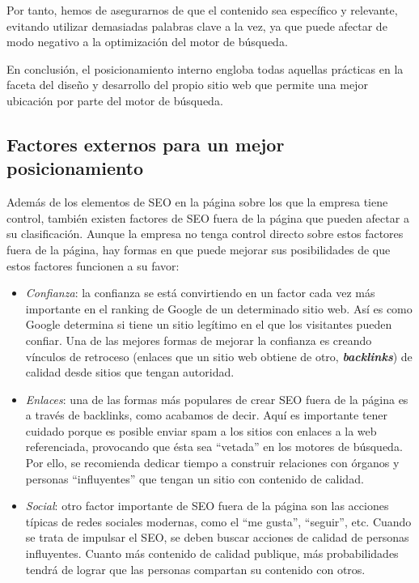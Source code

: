 \documentclass[a4paper,11pt]{scrartcl}
\begin{document}
Por tanto, hemos de asegurarnos de que el contenido sea específico y relevante, evitando utilizar demasiadas palabras clave a la vez, ya que puede afectar de modo negativo a la optimización del motor de búsqueda.

En conclusión, el posicionamiento interno engloba todas aquellas prácticas en la faceta del diseño y desarrollo del propio sitio web que permite una mejor ubicación por parte del motor de búsqueda.

\subsection{Factores externos para un mejor posicionamiento}

Además de los elementos de SEO en la página sobre los que la empresa tiene control, también existen factores de SEO fuera de la página que pueden afectar a su clasificación. Aunque la empresa no tenga control directo sobre estos factores fuera de la página, hay formas en que puede mejorar sus posibilidades de que estos factores funcionen a su favor: 

\begin{itemize}
\item 	\textit{Confianza}: la confianza se está convirtiendo en un factor cada vez más importante en el ranking de Google de un determinado sitio web. Así es como Google determina si tiene un sitio legítimo en el que los visitantes pueden confiar. Una de las mejores formas de mejorar la confianza es creando vínculos de retroceso (enlaces que un sitio web obtiene de otro, \textit{\textbf{backlinks}}) de calidad desde sitios que tengan autoridad. 
\item 	\textit{Enlaces}: una de las formas más populares de crear SEO fuera de la página es a través de backlinks, como acabamos de decir. Aquí es importante tener cuidado porque es posible enviar spam a los sitios con enlaces a la web referenciada, provocando que ésta sea “vetada” en los motores de búsqueda. Por ello, se recomienda dedicar tiempo a construir relaciones con órganos y personas “influyentes” que tengan un sitio con contenido de calidad. 
\item 	\textit{Social}:  otro factor importante de SEO fuera de la página son las acciones típicas de redes sociales modernas, como el “me gusta”, “seguir”, etc. Cuando se trata de impulsar el SEO, se deben buscar acciones de calidad de personas influyentes. Cuanto más contenido de calidad publique, más probabilidades tendrá de lograr que las personas compartan su contenido con otros.
\end{itemize}
\end{document}
